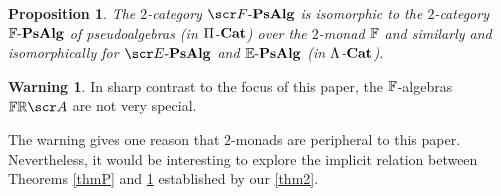 \documentclass{amsart}
\newtheorem{prop}{Proposition}[section]
\theoremstyle{definition}
\newtheorem{warn}{Warning}[section]
\numberwithin{equation}{section}
\begin{document}
 \begin{prop}\label{thmF} The $2$-category  $\sF\text{-}\bf{PsAlg}$ is isomorphic to the $2$-category \linebreak $\mathbb{F}\text{-}\bf{PsAlg}$ of pseudoalgebras (in 
 $\Pi$-$\bf{Cat}$) over the $2$-monad $\mathbb{F}$ and similarly and isomorphically for  
 $\sE\text{-}\bf{PsAlg}$ and $\mathbb{E}\text{-}\bf{PsAlg}$ (in $\Lambda$-$\bf{Cat}$).
 \end{prop}
 
 \begin{warn}\label{warn} In sharp contrast to the focus of this paper,  the $\mathbb{F}$-algebras $\bF\bR\sA$ 
 are not very special.  
 \end{warn}
 
 The warning gives one reason that $2$-monads are peripheral to this paper.  Nevertheless, it would be interesting to explore the implicit relation between Theorems \ref{thmP} and \ref{thmF} established by our \autoref{thm2}.



\end{document}

